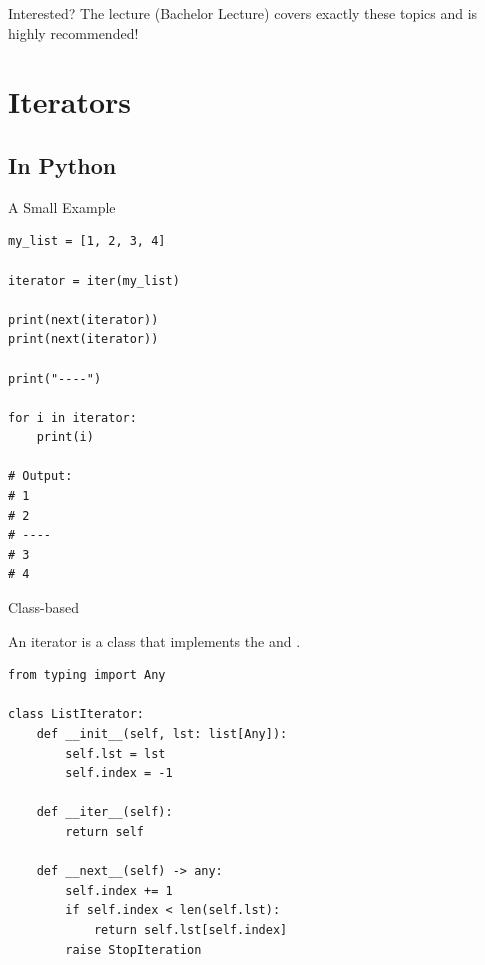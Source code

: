 \documentclass[12pt, aspectratio=169, usepdftitle=false, handout]{beamer}
\newcommand{\pp}[1]{\lpl{#1}}
\begin{document}




\begin{frame}[fragile]{Interested?}
	The lecture   (Bachelor Lecture) covers exactly these topics and is highly recommended!\\
\end{frame}



{}



\section{Iterators}




\subsection{In Python}

\begin{frame}[fragile]{A Small Example}

    \begin{lstlisting}[language=pytiny]
my_list = [1, 2, 3, 4]

iterator = iter(my_list)

print(next(iterator))
print(next(iterator))

print("----")

for i in iterator:
    print(i)

# Output:
# 1
# 2
# ----
# 3
# 4
    \end{lstlisting}

\end{frame}


\begin{frame}[fragile]{Class-based}

    An iterator is a class that implements the  \pp{__iter()__} and \pp{__next()__}.

    \medskip

    \begin{lstlisting}[language=pytiny]
from typing import Any

class ListIterator:
    def __init__(self, lst: list[Any]):
        self.lst = lst
        self.index = -1

    def __iter__(self):
        return self

    def __next__(self) -> any:
        self.index += 1
        if self.index < len(self.lst):
            return self.lst[self.index]
        raise StopIteration

    \end{lstlisting}

\end{frame}
\end{document}

